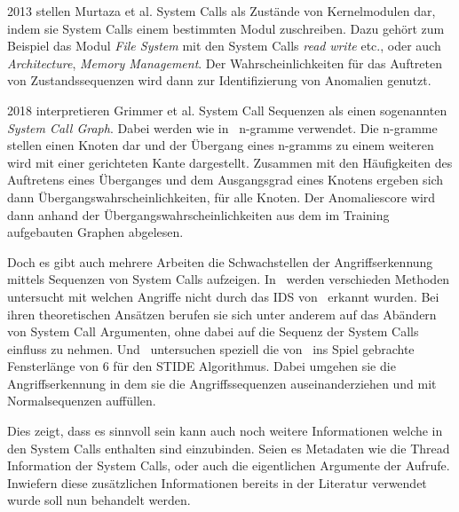         2013 stellen Murtaza et al. System Calls als Zustände von Kernelmodulen dar, indem sie System Calls einem bestimmten Modul zuschreiben.
        Dazu gehört zum Beispiel das Modul \textit{File System} mit den System Calls \textit{read} \textit{write} etc., oder auch \textit{Architecture}, \textit{Memory Management}.
        Der Wahrscheinlichkeiten für das Auftreten von Zustandssequenzen wird dann zur Identifizierung von Anomalien genutzt.~\cite{SYSTEM_STATES}

        2018 interpretieren Grimmer et al. System Call Sequenzen als einen sogenannten \textit{System Call Graph}.
        Dabei werden wie in~\cite{STIDE_Alternatives} n-gramme verwendet.
        Die n-gramme stellen einen Knoten dar und der Übergang eines n-gramms zu einem weiteren wird mit einer gerichteten Kante dargestellt.
        Zusammen mit den Häufigkeiten des Auftretens eines Überganges und dem Ausgangsgrad eines Knotens ergeben sich dann Übergangswahrscheinlichkeiten, für alle Knoten.
        Der Anomaliescore wird dann anhand der Übergangswahrscheinlichkeiten aus dem im Training aufgebauten Graphen abgelesen.~\cite{SYSCALL_GRAPHS} 


    Doch es gibt auch mehrere Arbeiten die Schwachstellen der Angriffserkennung mittels Sequenzen von System Calls aufzeigen.
    In~\cite{Syscallseqexploit1} werden verschieden Methoden untersucht mit welchen Angriffe nicht durch das IDS von~\cite{FORREST2000} erkannt wurden.
    Bei ihren theoretischen Ansätzen berufen sie sich unter anderem auf das Abändern von System Call Argumenten, ohne dabei auf die Sequenz der System Calls einfluss zu nehmen.
    Und~\cite{Syscallseqexploit3} untersuchen speziell die von~\cite{FORREST} ins Spiel gebrachte Fensterlänge von $6$ für den \ac{STIDE} Algorithmus.
    Dabei umgehen sie die Angriffserkennung in dem sie die Angriffssequenzen auseinanderziehen und mit Normalsequenzen auffüllen.

    Dies zeigt, dass es sinnvoll sein kann auch noch weitere Informationen welche in den System Calls enthalten sind einzubinden.
    Seien es Metadaten wie die Thread Information der System Calls, oder auch die eigentlichen Argumente der Aufrufe.
    Inwiefern diese zusätzlichen Informationen bereits in der Literatur verwendet wurde soll nun behandelt werden.

